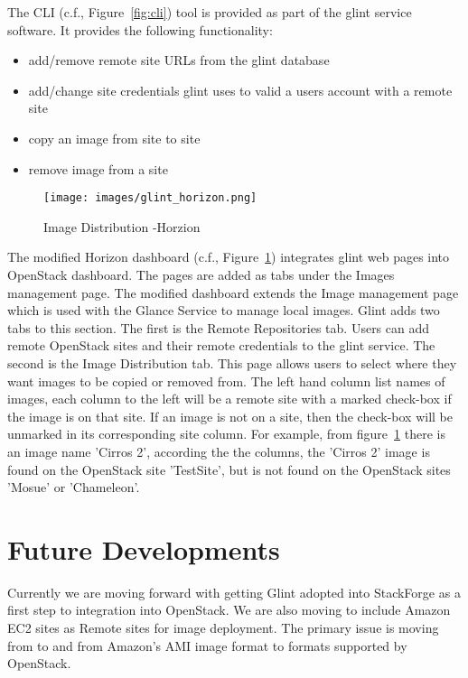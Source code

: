 \documentclass[a4paper]{jpconf}
\begin{document}
The CLI (c.f., Figure~\ref{fig:cli}) tool is provided as part of the glint service software. It provides the following functionality:
\begin{itemize}
\item add/remove remote site URLs from the glint database
\item add/change site credentials glint uses to valid a users account with a remote site
\item copy an image from site to site
\item remove image from a site
\end{itemize}

\begin{figure}[H]
\begin{center}
\texttt{[image: images/glint\_horizon.png]}
\caption{\label{fig:horizon}Image Distribution -Horzion }
\end{center}
\end{figure}

The modified Horizon dashboard (c.f., Figure~\ref{fig:horizon}) integrates glint web pages into OpenStack dashboard. The pages are added as tabs under the Images management page. The modified dashboard extends the Image management page which is used with the Glance Service to manage local images. Glint adds two tabs to this section. The first is the Remote Repositories tab. Users can add remote OpenStack sites and their remote credentials to the glint service. The second is the Image Distribution tab. This page allows users to select where they want images to be copied or removed from. The left hand column list names of images, each column to the left will be a remote site with a marked check-box if the image is on that site. If an image is not on a site, then the check-box will be unmarked in its corresponding site column. For example, from figure~\ref{fig:horizon} there is an image name 'Cirros 2', according the the columns, the 'Cirros 2' image is found on the OpenStack site 'TestSite', but is not found on the OpenStack sites 'Mosue' or 'Chameleon'. 

\section{Future Developments}
Currently we are moving forward with getting Glint adopted into StackForge as a first step to integration into OpenStack. We are also moving to include Amazon EC2 sites as Remote sites for image deployment. The primary issue is moving from to and from Amazon's AMI image format to formats supported by OpenStack. 
\end{document}
